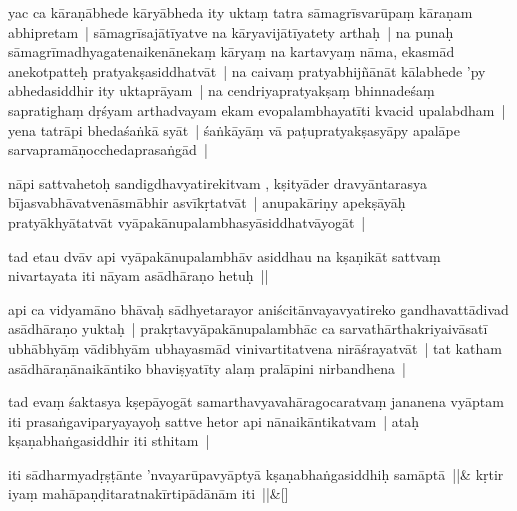 \documentclass[article,12pt,a4paper]{memoir}%
\newcounter{parCount}
\begin{document}
	  \pstart \leavevmode%
	\label{thakur75-81.26}yac ca kāraṇābhede kāryābheda ity uktaṃ tatra sāmagrīsvarūpaṃ kāraṇam abhipretam | sāmagrīsajātīyatve na kāryavijātīyatety arthaḥ | na punaḥ sāmagrīmadhyagatenaikenānekaṃ kāryaṃ na kartavyaṃ nāma, ekasmād anekotpatteḥ pratyakṣasiddhatvāt | na caivaṃ pratyabhijñānāt kālabhede 'py abhedasiddhir ity uktaprāyam | na cendriyapratyakṣaṃ bhinnadeśaṃ sapratighaṃ dṛśyam arthadvayam ekam evopalambhayatīti kvacid upalabdham | yena tatrāpi bhedaśaṅkā syāt | śaṅkāyāṃ vā paṭupratyakṣasyāpy apalāpe sarvapramāṇocchedaprasaṅgād |
	{}
	\pend%
      

	  \pstart \leavevmode%
	\label{thakur75-82.3}nāpi sattvahetoḥ sandigdhavyatirekitvam , kṣityāder dravyāntarasya bījasvabhāvatvenāsmābhir asvīkṛtatvāt | anupakāriṇy apekṣāyāḥ pratyākhyātatvāt vyāpakānupalambhasyāsiddhatvāyogāt |
	{}
	\pend%
      

	  \pstart \leavevmode%
	\label{thakur75-82.6}tad etau dvāv api vyāpakānupalambhāv asiddhau na kṣaṇikāt sattvaṃ nivartayata iti nāyam asādhāraṇo hetuḥ ||
	{}
	\pend%
      

	  \pstart \leavevmode%
	\label{thakur75-82.8}api ca vidyamāno bhāvaḥ sādhyetarayor aniścitānvayavyatireko gandhavattādivad asādhāraṇo yuktaḥ | prakṛtavyāpakānupalambhāc ca sarvathārthakriyaivāsatī ubhābhyāṃ vādibhyām ubhayasmād vinivartitatvena nirāśrayatvāt | tat katham asādhāraṇānaikāntiko bhaviṣyatīty alaṃ pralāpini nirbandhena |
	{}
	\pend%
      

	  \pstart \leavevmode%
	\label{thakur75-82.12}tad evaṃ śaktasya kṣepāyogāt samarthavyavahāragocaratvaṃ jananena vyāptam iti prasaṅgaviparyayayoḥ sattve hetor api nānaikāntikatvam | ataḥ kṣaṇabhaṅgasiddhir iti sthitam |
	{}
	\pend%
      
	    
	    \stanza[\smallbreak]
	  \label{thakur75-82.15} iti sādharmyadṛṣṭānte 'nvayarūpavyāptyā kṣaṇabhaṅgasiddhiḥ samāptā ||&\label{thakur75-82.17} kṛtir iyaṃ mahāpaṇḍitaratnakīrtipādānām iti ||\&[\smallbreak]
	  
\end{document}
